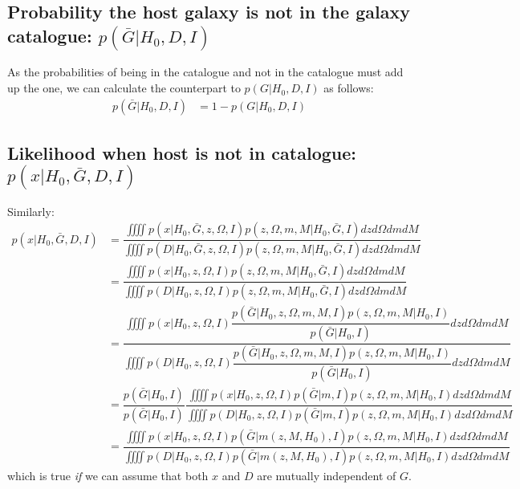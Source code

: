 \documentclass[a4paper,10pt]{article}
\begin{document}
\subsection{Probability the host galaxy is not in the galaxy catalogue: $p(\bar{G}|H_0,D,I)$}

As the probabilities of being in the catalogue and not in the catalogue must add up the one, we can calculate the counterpart to $p(G|H_0,D,I)$ as follows:
\begin{equation}
\begin{aligned}
p(\bar{G}|H_0,D,I) &= 1 - p(G|H_0,D,I)
\end{aligned}
\end{equation}








\subsection{Likelihood when host is not in catalogue: $p(x|H_0,\bar{G},D,I)$}
Similarly:
\begin{equation}
\begin{aligned}
p(x|H_0,\bar{G},D,I) &= \dfrac{\iiiint p(x|H_0,\bar{G},z,\Omega,I) p(z,\Omega,m,M|H_0,\bar{G},I) dz d\Omega dm dM}{\iiiint p(D|H_0,\bar{G},z,\Omega,I) p(z,\Omega,m,M|H_0,\bar{G},I) dz d\Omega dm dM}
\\ &= \dfrac{\iiiint p(x|H_0,z,\Omega,I) p(z,\Omega,m,M|H_0,\bar{G},I) dz d\Omega dm dM}{\iiiint p(D|H_0,z,\Omega,I) p(z,\Omega,m,M|H_0,\bar{G},I) dz d\Omega dm dM}
\\ &= \dfrac{\iiiint p(x|H_0,z,\Omega,I) \dfrac{p(\bar{G}|H_0,z,\Omega,m,M,I)p(z,\Omega,m,M|H_0,I)}{p(\bar{G}|H_0,I)} dz d\Omega dm dM}{\iiiint p(D|H_0,z,\Omega,I) \dfrac{p(\bar{G}|H_0,z,\Omega,m,M,I)p(z,\Omega,m,M|H_0,I)}{p(\bar{G}|H_0,I)} dz d\Omega dm dM}
\\ &= \dfrac{p(\bar{G}|H_0,I)}{p(\bar{G}|H_0,I)}\dfrac{\iiiint p(x|H_0,z,\Omega,I) p(\bar{G}|m,I)p(z,\Omega,m,M|H_0,I) dz d\Omega dm dM}{\iiiint p(D|H_0,z,\Omega,I) p(\bar{G}|m,I)p(z,\Omega,m,M|H_0,I) dz d\Omega dm dM}
\\ &= \dfrac{\iiiint p(x|H_0,z,\Omega,I) p(\bar{G}|m(z,M,H_0),I)p(z,\Omega,m,M|H_0,I) dz d\Omega dm dM}{\iiiint p(D|H_0,z,\Omega,I) p(\bar{G}|m(z,M,H_0),I)p(z,\Omega,m,M|H_0,I) dz d\Omega dm dM}
\end{aligned}
\end{equation}
which is true \emph{if} we can assume that both $x$ and $D$ are mutually independent of $G$.
\end{document}
